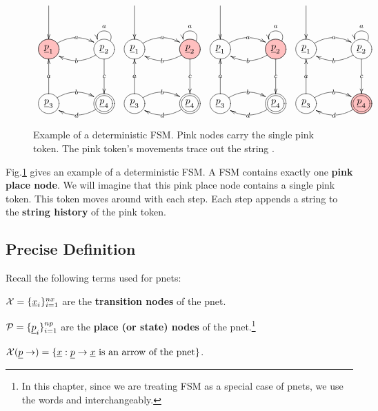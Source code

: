 \begin{figure}[h!]
$$
\begin{array}{cccc}
\xymatrix@C=3pc@R=3pc{
\ar[d] 
\\
\PinkCircle{\rvp_1}\ar@/^1pc/[r]|a
&
\Circle{\rvp_2}\ar@/^1pc/[l]|b
\ar[d]|c \ar@(ru,lu)[]_a
\\
\Circle{\rvp_3}\ar@/^1pc/[r]|b
\ar[u]|a
&\DCircle{\rvp_4}\ar@/^1pc/[l]|d
}&
\xymatrix@C=3pc@R=3pc{
\ar[d] 
\\
\Circle{\rvp_1}\ar@/^1pc/[r]|a
&
\PinkCircle{\rvp_2}\ar@/^1pc/[l]|b
\ar[d]|c \ar@(ru,lu)[]_a
\\
\Circle{\rvp_3}\ar@/^1pc/[r]|b
\ar[u]|a
&\DCircle{\rvp_4}\ar@/^1pc/[l]|d
}&
\xymatrix@C=3pc@R=3pc{
\ar[d] 
\\
\Circle{\rvp_1}\ar@/^1pc/[r]|a
&
\PinkCircle{\rvp_2}\ar@/^1pc/[l]|b
\ar[d]|c \ar@(ru,lu)[]_a
\\
\Circle{\rvp_3}\ar@/^1pc/[r]|b
\ar[u]|a
&\DCircle{\rvp_4}\ar@/^1pc/[l]|d
}&
\xymatrix@C=3pc@R=3pc{
\ar[d] 
\\
\Circle{\rvp_1}\ar@/^1pc/[r]|a
&
\Circle{\rvp_2}\ar@/^1pc/[l]|b
\ar[d]|c \ar@(ru,lu)[]_a
\\
\Circle{\rvp_3}\ar@/^1pc/[r]|b
\ar[u]|a
&\PinkDCircle{\rvp_4}\ar@/^1pc/[l]|d
}
\end{array}
$$
\caption{Example of a deterministic FSM. Pink nodes carry the single pink token.
The pink token's movements trace out the string .}
\label{fig-det-fsm}
\end{figure}
Fig.\ref{fig-det-fsm}
gives an example of a deterministic
FSM. A FSM contains exactly one {\bf pink place node}. We will 
imagine that this pink place node contains a single pink token. This token moves around with each step.
Each step appends a string to the {\bf string history} of the pink token.

\subsection{Precise Definition}

Recall the following terms used for pnets:

$\calx =\{\rvx_i\}_{i=1}^{nx}$ are the {\bf transition nodes} of the pnet.

$\calp =\{\rvp_i\}_{i=1}^{np}$ are the {\bf place (or state) nodes} of the pnet.\footnote{In this
chapter, since we are treating FSM as a special case of pnets, we use the words  and
 interchangeably.}

$\calx(\rvp\rarrow)=\{\rvx: \rvp\rarrow\rvx \text{ is an arrow of the pnet}\}$.

